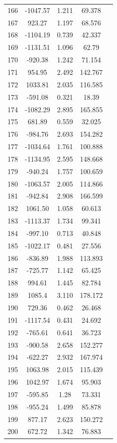 {\begin{longtable}{ccccc}
166 & -1047.57 & 1.211 & 69.378 \\
167 & 923.27 & 1.197 & 68.576 \\
168 & -1104.19 & 0.739 & 42.337 \\
169 & -1131.51 & 1.096 & 62.79 \\
170 & -920.38 & 1.242 & 71.154 \\
171 & 954.95 & 2.492 & 142.767 \\
172 & 1033.81 & 2.035 & 116.585 \\
173 & -591.08 & 0.321 & 18.39 \\
174 & -1082.29 & 2.895 & 165.855 \\
175 & 681.89 & 0.559 & 32.025 \\
176 & -984.76 & 2.693 & 154.282 \\
177 & -1034.64 & 1.761 & 100.888 \\
178 & -1134.95 & 2.595 & 148.668 \\
179 & -940.24 & 1.757 & 100.659 \\
180 & -1063.57 & 2.005 & 114.866 \\
181 & -942.84 & 2.908 & 166.599 \\
182 & 1061.50 & 1.058 & 60.613 \\
183 & -1113.37 & 1.734 & 99.341 \\
184 & -997.10 & 0.713 & 40.848 \\
185 & -1022.17 & 0.481 & 27.556 \\
186 & -836.89 & 1.988 & 113.893 \\
187 & -725.77 & 1.142 & 65.425 \\
188 & 994.61 & 1.445 & 82.784 \\
189 & 1085.4 & 3.110 & 178.172 \\
190 & 729.36 & 0.462 & 26.468 \\
191 & -1117.54 & 0.431 & 24.692 \\
192 & -765.61 & 0.641 & 36.723 \\
193 & -900.58 & 2.658 & 152.277 \\
194 & -622.27 & 2.932 & 167.974 \\
195 & 1063.98 & 2.015 & 115.439 \\
196 & 1042.97 & 1.674 & 95.903 \\
197 & -595.85 & 1.28 & 73.331 \\
198 & -955.24 & 1.499 & 85.878 \\
199 & 877.17 & 2.623 & 150.272 \\
200 & 672.72 & 1.342 & 76.883 \\ \hline
\end{longtable}
}

